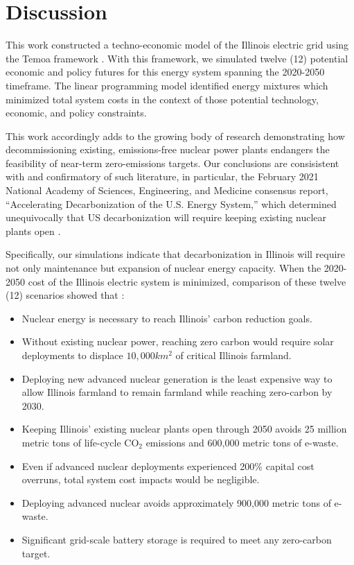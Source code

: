 \section{Discussion}
This work constructed a techno-economic model of the Illinois electric grid 
using the Temoa framework \cite{decarolis_modelling_2016}. With this framework, 
we simulated twelve (12) potential economic and policy futures for this energy 
system spanning the 2020-2050 timeframe. The linear programming model 
identified energy mixtures which minimized total system costs 
in the context of those potential technology, economic, and policy constraints.

This work accordingly adds to the growing body of research demonstrating how 
decommissioning existing, emissions-free nuclear power plants endangers the 
feasibility of near-term zero-emissions targets.  Our conclusions are 
consisistent with and confirmatory of such literature, in particular, the 
February 2021 National Academy of Sciences, Engineering, and Medicine consensus 
report, ``Accelerating Decarbonization of the U.S. Energy System,'' which determined unequivocally that US decarbonization will require keeping existing nuclear plants open
\cite{national_academies_of_sciences_engineering_and_medicine_2021_accelerating_2021}.

Specifically, our simulations indicate that decarbonization
in Illinois will require not only maintenance but expansion of nuclear energy capacity.
When the 2020-2050 cost of the Illinois electric system is minimized, 
comparison of these twelve (12) scenarios showed that :

\begin{itemize}
        \item Nuclear energy is necessary to reach Illinois' carbon reduction
                goals.
        \item Without existing nuclear power, reaching zero carbon would
                require solar deployments to displace $10,000km^2$ of critical
                Illinois
                farmland.
        \item Deploying new advanced nuclear generation is the least expensive way to
                allow Illinois farmland to remain farmland while reaching
                zero-carbon by 2030.
        \item Keeping Illinois' existing nuclear plants open through
                2050 avoids 25 million metric tons of life-cycle CO$_2$
                emissions and 600,000 metric tons of e-waste.
        \item Even if advanced nuclear deployments experienced 200\% capital
                cost overruns, total system cost impacts would be negligible.
        \item Deploying advanced nuclear avoids approximately 900,000 metric
                tons of e-waste.
        \item Significant grid-scale battery storage is required to meet any zero-carbon
                target.
\end{itemize}


